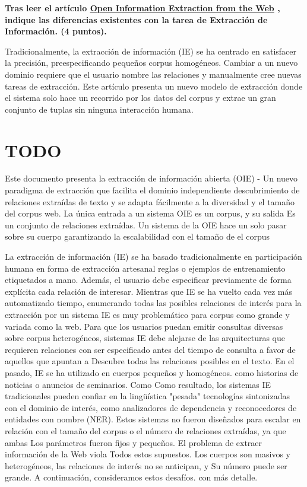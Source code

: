\documentclass[11pt]{exam}
\begin{document}
\begin{questions}
{\bf \question Tras leer el artículo \href{https://www.aaai.org/Papers/IJCAI/2007/IJCAI07-429.pdf}{Open Information Extraction from the Web} , indique las diferencias existentes con la tarea de Extracción de Información. (4 puntos).}

Tradicionalmente, la extracción de información (IE) se ha centrado en satisfacer la precisión, preespecificando pequeños corpus homogéneos. Cambiar a un nuevo dominio requiere que el usuario nombre las relaciones y manualmente cree nuevas tareas de extracción. Este artículo presenta un nuevo modelo de extracción donde el sistema solo hace un recorrido por los datos del corpus y extrae un gran conjunto de tuplas sin ninguna interacción humana. 

\section*{TODO}

Este documento presenta la extracción de información abierta (OIE) -
Un nuevo paradigma de extracción que facilita el dominio independiente
descubrimiento de relaciones extraídas de texto y
se adapta fácilmente a la diversidad y el tamaño del corpus web.
La única entrada a un sistema OIE es un corpus, y su salida
Es un conjunto de relaciones extraídas. Un sistema de la OIE hace un solo
pasar sobre su cuerpo garantizando la escalabilidad con el tamaño de
el corpus

La extracción de información (IE) se ha basado tradicionalmente en
participación humana en forma de extracción artesanal
reglas o ejemplos de entrenamiento etiquetados a mano. Además,
el usuario debe especificar previamente de forma explícita cada relación de
interesar. Mientras que IE se ha vuelto cada vez más automatizado
tiempo, enumerando todas las posibles relaciones de interés para la extracción
por un sistema IE es muy problemático para corpus como
grande y variada como la web. Para que los usuarios puedan
emitir consultas diversas sobre corpus heterogéneos, sistemas IE
debe alejarse de las arquitecturas que requieren relaciones con
ser especificado antes del tiempo de consulta a favor de aquellos que apuntan a
Descubre todas las relaciones posibles en el texto.
En el pasado, IE se ha utilizado en cuerpos pequeños y homogéneos.
como historias de noticias o anuncios de seminarios. Como
Como resultado, los sistemas IE tradicionales pueden confiar en la lingüística "pesada"
tecnologías sintonizadas con el dominio de interés, como
analizadores de dependencia y reconocedores de entidades con nombre (NER).
Estos sistemas no fueron diseñados para escalar en relación con el tamaño
del corpus o el número de relaciones extraídas, ya que ambas
Los parámetros fueron fijos y pequeños.
El problema de extraer información de la Web viola
Todos estos supuestos. Los cuerpos son masivos y heterogéneos,
las relaciones de interés no se anticipan, y
Su número puede ser grande. A continuación, consideramos estos desafíos.
con más detalle.


\end{questions}
\end{document}
